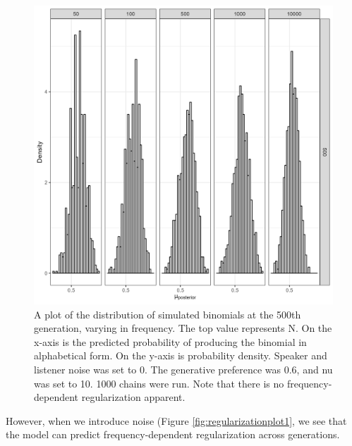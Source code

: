 \documentclass[
  jou,floatsintext]{apa6}
\begin{document}
\begin{figure}

{\centering \includegraphics[width=1\linewidth]{Figures/noNoise} 

}

\caption{A plot of the distribution of simulated binomials at the 500th generation, varying in frequency. The top value represents N. On the x-axis is the predicted probability of producing the binomial in alphabetical form. On the y-axis is probability density. Speaker and listener noise was set to 0. The generative preference was 0.6, and nu was set to 10. 1000 chains were run. Note that there is no frequency-dependent regularization apparent.}\label{fig:noNoisePlot}
\end{figure}

However, when we introduce noise (Figure \ref{fig:regularizationplot1}, we see that the model can predict frequency-dependent regularization across generations.
\end{document}
